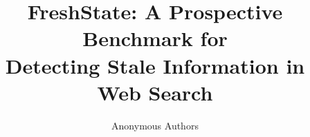 \documentclass{article}
\title{FreshState: A Prospective Benchmark for\\Detecting Stale Information in Web Search}
\author{Anonymous Authors}
\theoremstyle{plain}
\theoremstyle{definition}
\theoremstyle{remark}
\begin{document}
\maketitle

\begin{abstract}

\end{abstract}










\newpage
\appendix

\end{document}
